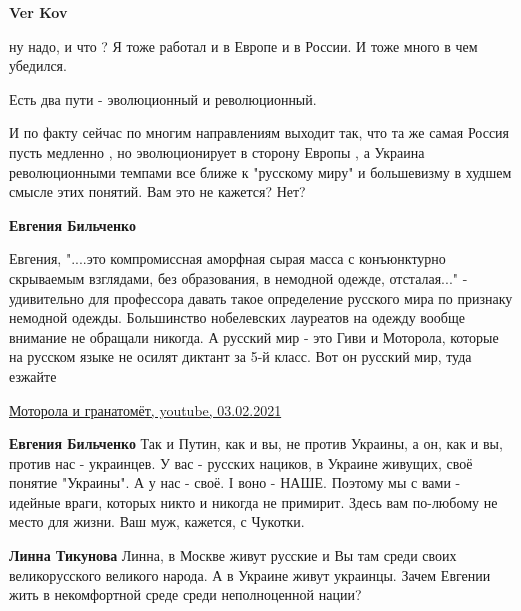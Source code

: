 \begin{itemize}
\begin{itemize}
\textbf{Ver Kov} 

ну надо, и что ? Я тоже работал и в Европе и в России. И тоже много в чем
убедился.

Есть два пути - эволюционный и революционный.

И по факту сейчас по многим направлениям выходит так, что та же самая Россия
пусть медленно , но эволюционирует в сторону Европы , а Украина революционными
темпами все ближе к "русскому миру" и большевизму в худшем смысле этих понятий.
Вам это не кажется? Нет?

 
\textbf{Евгения Бильченко} 

Евгения, "....это компромиссная аморфная сырая масса
с конъюнктурно скрываемым взглядами, без образования, в немодной одежде,
отсталая..." - удивительно для профессора давать такое определение русского
мира по признаку немодной одежды. Большинство нобелевских лауреатов на одежду
вообще внимание не обращали никогда. А русский мир - это Гиви и Моторола,
которые на русском языке не осилят диктант за 5-й класс. Вот он русский мир,
туда езжайте

\href{https://www.youtube.com/watch?v=MoFYXKgr8Bo&t=2s}{%
Моторола и гранатомёт, youtube, 03.02.2021%
}

 
\textbf{Евгения Бильченко} Так и Путин, как и вы, не против Украины, а он, как и вы, против нас - украинцев. У вас - русских нациков, в Украине живущих, своё понятие "Украины". А у нас - своё. І воно - НАШЕ. Поэтому мы с вами - идейные враги, которых никто и никогда не примирит. Здесь вам по-любому не место для жизни. Ваш муж, кажется, с Чукотки.

 
\textbf{Линна Тикунова} Линна, в Москве живут русские и Вы там среди своих великорусского великого народа. А в Украине живут украинцы. Зачем Евгении жить в некомфортной среде среди неполноценной нации?


\end{itemize}
\end{itemize}
